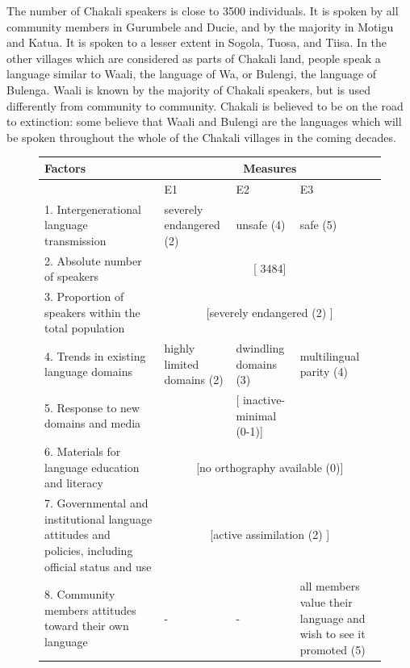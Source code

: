The number of Chakali speakers is close
to 3500 individuals. It is spoken by all community members in Gurumbele and 
Ducie, and by
the majority in Motigu and Katua. It is spoken to a lesser extent in Sogola,
Tuosa,  and Tiisa.  In the other villages which are considered as  parts of
Chakali land, people speak a language similar to Waali, the language of  Wa, or
Bulengi, the language of Bulenga. Waali is known by the majority of Chakali
speakers,  but is used differently from community to community.   Chakali is 
believed
to be on the road to extinction: some believe that Waali and Bulengi are the
languages which will be spoken throughout the whole of the Chakali villages in 
the
coming decades.



\begin{figure}
\footnotesize
  \centering
 \begin{tabular}{p{5cm}p{3.5cm}p{3.5cm}p{3.5cm}}


\toprule
    Factors & \multicolumn{3}{c}{Measures}\\[1ex]\midrule
 &E1&E2&E3\\[1ex]\midrule

1. Intergenerational language transmission &  {severely endangered} 
(2) & {unsafe} (4)& {safe} (5)\\

2.  Absolute number of speakers  &
\multicolumn{3}{c}{[{ 3484}]}\\ 

3. Proportion of speakers within the total population &
\multicolumn{3}{c}{[{severely
endangered}  (2) ]}\\

4.  Trends in existing language domains & {highly limited domains}
(2)& {dwindling domains} (3)&{multilingual parity} (4)\\

5.  Response to new domains and media& & [{
inactive-minimal}
(0-1)]& \\


6.  Materials for language education and literacy & 
\multicolumn{3}{c}{[{no orthography available} (0)]}\\

7. Governmental and institutional language attitudes
and policies, including official status and use &
\multicolumn{3}{c}{[{active
assimilation} (2) ]}\\


8. Community members attitudes toward their own language &-&-&{all
members value their language and wish to see it promoted} (5) 
\\


\end{tabular}
\end{figure}

